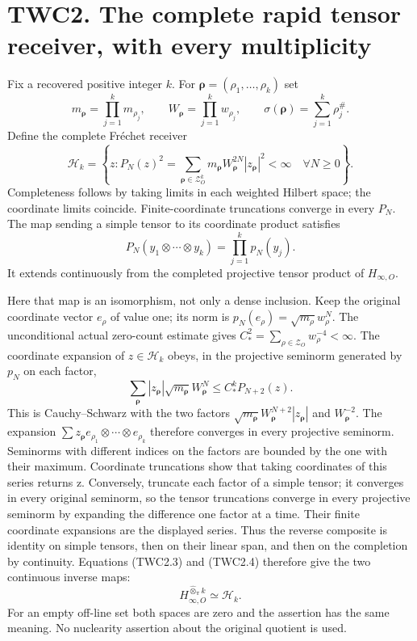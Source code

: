 \section{TWC2. The complete rapid tensor receiver, with every
multiplicity}\label{twc2.-the-complete-rapid-tensor-receiver-with-every-multiplicity}

Fix a recovered positive integer \(k\). For
\(\boldsymbol\rho=(\rho_1,\ldots,\rho_k)\) set \[
m_{\boldsymbol\rho}=\prod_{j=1}^km_{\rho_j},\qquad
W_{\boldsymbol\rho}=\prod_{j=1}^kw_{\rho_j},\qquad
\sigma(\boldsymbol\rho)=\sum_{j=1}^k\rho_j^\#.
\tag{TWC2.1}
\] Define the complete Fréchet receiver \[
\mathscr H_k=\left\{z:
P_N(z)^2=\sum_{\boldsymbol\rho\in\mathscr Z_O^k}
m_{\boldsymbol\rho}W_{\boldsymbol\rho}^{2N}|z_{\boldsymbol\rho}|^2<\infty
\quad\forall N\ge0\right\}.
\tag{TWC2.2}
\] Completeness follows by taking limits in each weighted Hilbert space;
the coordinate limits coincide. Finite-coordinate truncations converge
in every \(P_N\). The map sending a simple tensor to its coordinate
product satisfies \[
P_N(y_1\otimes\cdots\otimes y_k)=\prod_{j=1}^kp_N(y_j).
\tag{TWC2.3}
\] It extends continuously from the completed projective tensor product
of \(H_{\infty,O}\).

Here that map is an isomorphism, not only a dense inclusion. Keep the
original coordinate vector \(e_\rho\) of value one; its norm is
\(p_N(e_\rho)=\sqrt{m_\rho}w_\rho^N\). The unconditional actual
zero-count estimate gives
\(C_*^2=\sum_{\rho\in\mathscr Z_O}w_\rho^{-4}<\infty\). The coordinate
expansion of \(z\in\mathscr H_k\) obeys, in the projective seminorm
generated by \(p_N\) on each factor, \[
\sum_{\boldsymbol\rho}|z_{\boldsymbol\rho}|
\sqrt{m_{\boldsymbol\rho}}W_{\boldsymbol\rho}^{N}
\le C_*^k P_{N+2}(z).
\tag{TWC2.4}
\] This is Cauchy--Schwarz with the two factors
\(\sqrt{m_{\boldsymbol\rho}}W_{\boldsymbol\rho}^{N+2}|z_{\boldsymbol\rho}|\)
and \(W_{\boldsymbol\rho}^{-2}\). The expansion
\(\sum z_{\boldsymbol\rho}
 e_{\rho_1}\otimes\cdots\otimes e_{\rho_k}\) therefore converges in
every projective seminorm. Seminorms with different indices on the
factors are bounded by the one with their maximum. Coordinate
truncations show that taking coordinates of this series returns z.
Conversely, truncate each factor of a simple tensor; it converges in
every original seminorm, so the tensor truncations converge in every
projective seminorm by expanding the difference one factor at a time.
Their finite coordinate expansions are the displayed series. Thus the
reverse composite is identity on simple tensors, then on their linear
span, and then on the completion by continuity. Equations (TWC2.3) and
(TWC2.4) therefore give the two continuous inverse maps: \[
H_{\infty,O}^{\widehat\otimes_\pi k}\simeq\mathscr H_k.
\tag{TWC2.5}
\] For an empty off-line set both spaces are zero and the assertion has
the same meaning. No nuclearity assertion about the original quotient is
used.

